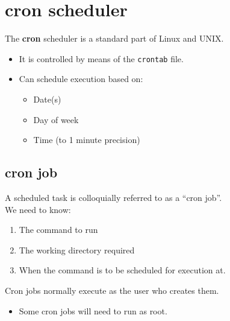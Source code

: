 \documentclass[slides]{pgnotes}
\begin{document}
\section{cron scheduler}

The \textbf{cron} scheduler is a standard part of Linux and UNIX.
\begin{itemize}
\item It is controlled by means of the \texttt{crontab} file.
\item Can schedule execution based on:
  \begin{itemize}
  \item Date(s)
  \item Day of week
  \item Time (to 1 minute precision)
  \end{itemize}
\end{itemize}

\subsection{cron job}

A scheduled task is colloquially referred to as a ``cron job''.\\
We need to know:
\begin{enumerate}
\item The command to run
\item The working directory required
\item When the command is to be scheduled for execution at.
\end{enumerate}
Cron jobs normally execute as the user who creates them.
\begin{itemize}
\item Some cron jobs will need to run as root.
\end{itemize}
\end{document}
